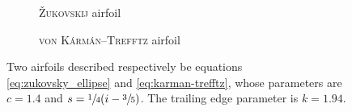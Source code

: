 \begin{figure}[h]
  \centering
  \begin{subfigure}{.45\textwidth}
    \centering
    \scalebox{1}{}
    \caption{\textsc{Žukovskij} airfoil}
    \label{subfig:zukovskij_foil}
  \end{subfigure}
  \begin{subfigure}{.45\textwidth}
    \centering
    \scalebox{1}{}
    \caption{\textsc{von Kármán}--\textsc{Trefftz} airfoil}
    \label{subfig:karman-trefftz_foil}
  \end{subfigure}
  \caption{%
        Two airfoils described respectively be equations \eqref{eq:zukovsky_ellipse} and \eqref{eq:karman-trefftz}, whose parameters are $c = 1.4$ and $s = \sfrac{1}{4}(i -\sfrac{3}{5})$.
        The trailing edge parameter is $k = 1.94$.
        }
  \label{fig:analytic_foils}
\end{figure}
